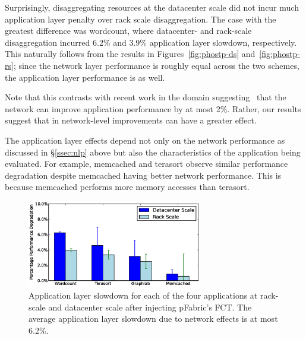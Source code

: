 Surprisingly, disaggregating resources at the datacenter scale did not incur much application layer penalty over rack scale disaggregation. The case with the greatest difference was wordcount, where datacenter- and rack-scale disaggregation incurred 6.2\% and 3.9\% application layer slowdown, respectively. This naturally follows from the results in Figures~\ref{fig:phostp-ds} and~\ref{fig:phostp-rs}; since the network layer performance is roughly equal across the two schemes, the application layer performance is as well. 

Note that this contrasts with recent work in the \pdis domain suggesting~\cite{kay-nsdi15} that the network can improve application performance by at most 2\%. Rather, our results suggest that in \dis network-level improvements can have a greater effect.

The application layer effects depend not only on the network performance as discussed in \S\ref{ssec:nlp} above but also the characteristics of the application being evaluated. For example, memcached and terasort observe similar performance degradation despite memcached having better network performance. 
This is because memcached performs more memory accesses than terasort. 

%
\begin{figure}
  \centering
    \includegraphics[width = 3in]{img/slowdown.eps} 
  \caption{\small{Application layer slowdown for each of the four applications at rack-scale and datacenter scale after injecting pFabric's FCT. The average application layer slowdown due to network effects is at most 6.2\%.}}
  \label{fig:appfabric}
\end{figure}
%


%

